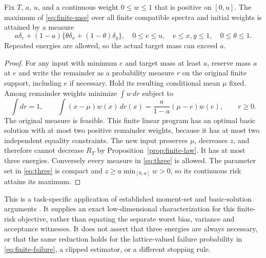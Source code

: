 \begin{theorem}\label{thm:three}
Fix $T$, $a$, $u$, and a continuous weight $0\leq w\leq1$ that is
positive on $[0,u]$. The maximum of \eqref{eq:finite-mse} over all finite
compatible spectra and initial weights is attained by a measure
\begin{equation}\label{eq:three}
 a\delta_e+(1-a)\{\theta\delta_x+(1-\theta)\delta_y\},
 \quad 0\leq e\leq u,\quad e\leq x,y\leq1,\quad0\leq\theta\leq1.
\end{equation}
Repeated energies are allowed, so the actual target mass can exceed $a$.
\end{theorem}
\begin{proof}
For any input with minimum $e$ and target mass at least $a$, reserve mass
$a$ at $e$ and write the remainder as a probability measure $r$ on the
original finite support, including $e$ if necessary. Hold its resulting
conditional mean $\mu$ fixed. Among remainder weights minimize
$\int w\,dr$ subject to
\begin{equation}\label{eq:moment-lp}
 \int dr=1,\qquad
 \int (x-\mu)w(x)\,dr(x)
 =\frac{a}{1-a}(\mu-e)w(e),\qquad r\geq0.
\end{equation}
The original measure is feasible. This finite linear program has an
optimal basic solution with at most two positive remainder weights,
because it has at most two independent equality constraints. The new
input preserves $\mu$, decreases $z$, and therefore cannot decrease
$R_T$ by Proposition~\ref{prop:finite-law}. It has at most three energies.
Conversely every measure in \eqref{eq:three} is allowed. The parameter
set in \eqref{eq:three} is compact and $z\geq a\min_{[0,u]}w>0$, so its
continuous risk attains its maximum.
\end{proof}

This is a task-specific application of established moment-set and
basic-solution arguments \cite{Winkler,Pinelis}. It supplies an exact
low-dimensional characterization for this finite-risk objective, rather
than equating the separate worst bias, variance and acceptance witnesses.
It does not assert that three energies are always necessary, or that the
same reduction holds for the lattice-valued failure probability in
\eqref{eq:finite-failure}, a clipped estimator, or a different stopping rule.

